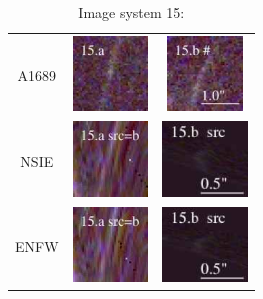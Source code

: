 \documentclass[useAMS,usenatbib]{mn2e}
\begin{document}
\begin{table}
  \caption{Image system 15:}\vspace{0mm}
  \begin{tabular}{ccc}
    \multicolumn{1}{m{1cm}}{{\Large A1689}}
    & \multicolumn{1}{m{1.7cm}}{\includegraphics[height=2.00cm,clip]{figs/nsie_img/rgb.img_15_a.ps}}
    & \multicolumn{1}{m{1.7cm}}{\includegraphics[height=2.00cm,clip]{figs/nsie_img/rgb.img_15_b.ps}} \\
    \multicolumn{1}{m{1cm}}{{\Large NSIE}}
    & \multicolumn{1}{m{1.7cm}}{\includegraphics[height=2.00cm,clip]{figs/nsie_img/rgb.pre_15_a_b_tri.ps}}
    & \multicolumn{1}{m{1.7cm}}{\includegraphics[height=2.00cm,clip]{figs/nsie_img/rgb.src_15_b.ps}} \\
    \multicolumn{1}{m{1cm}}{{\Large ENFW}}
    & \multicolumn{1}{m{1.7cm}}{\includegraphics[height=2.00cm,clip]{figs/enfw_img/rgb.pre_15_a_b_tri.ps}}
    & \multicolumn{1}{m{1.7cm}}{\includegraphics[height=2.00cm,clip]{figs/enfw_img/rgb.src_15_b.ps}} \\
  \end{tabular}

\end{table}
\end{document}
